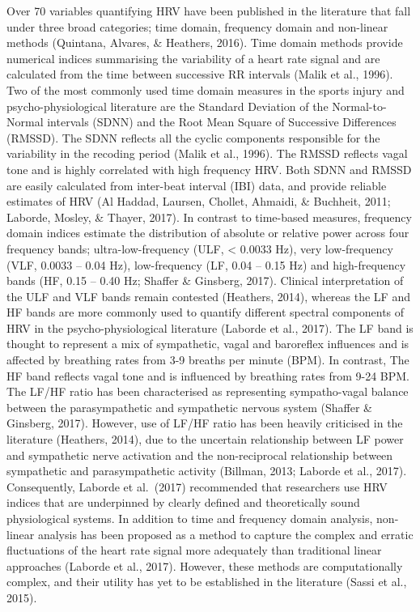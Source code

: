 \documentclass[man,floatsintext]{apa6}
\begin{document}
Over 70 variables quantifying HRV have been published in the literature that fall under three broad categories; time domain, frequency domain and non-linear methods (Quintana, Alvares, \& Heathers, 2016).
Time domain methods provide numerical indices summarising the variability of a heart rate signal and are calculated from the time between successive RR intervals (Malik et al., 1996).
Two of the most commonly used time domain measures in the sports injury and psycho-physiological literature are the Standard Deviation of the Normal-to-Normal intervals (SDNN) and the Root Mean Square of Successive Differences (RMSSD).
The SDNN reflects all the cyclic components responsible for the variability in the recoding period (Malik et al., 1996).
The RMSSD reflects vagal tone and is highly correlated with high frequency HRV.
Both SDNN and RMSSD are easily calculated from inter-beat interval (IBI) data, and provide reliable estimates of HRV (Al Haddad, Laursen, Chollet, Ahmaidi, \& Buchheit, 2011; Laborde, Mosley, \& Thayer, 2017).
In contrast to time-based measures, frequency domain indices estimate the distribution of absolute or relative power across four frequency bands; ultra-low-frequency (ULF, \textless{} 0.0033 Hz), very low-frequency (VLF, 0.0033 -- 0.04 Hz), low-frequency (LF, 0.04 -- 0.15 Hz) and high-frequency bands (HF, 0.15 -- 0.40 Hz; Shaffer \& Ginsberg, 2017).
Clinical interpretation of the ULF and VLF bands remain contested (Heathers, 2014), whereas the LF and HF bands are more commonly used to quantify different spectral components of HRV in the psycho-physiological literature (Laborde et al., 2017).
The LF band is thought to represent a mix of sympathetic, vagal and baroreflex influences and is affected by breathing rates from 3-9 breaths per minute (BPM). In contrast, The HF band reflects vagal tone and is influenced by breathing rates from 9-24 BPM.
The LF/HF ratio has been characterised as representing sympatho-vagal balance between the parasympathetic and sympathetic nervous system (Shaffer \& Ginsberg, 2017).
However, use of LF/HF ratio has been heavily criticised in the literature (Heathers, 2014), due to the uncertain relationship between LF power and sympathetic nerve activation and the non-reciprocal relationship between sympathetic and parasympathetic activity (Billman, 2013; Laborde et al., 2017).
Consequently, Laborde et al.~(2017) recommended that researchers use HRV indices that are underpinned by clearly defined and theoretically sound physiological systems.
In addition to time and frequency domain analysis, non-linear analysis has been proposed as a method to capture the complex and erratic fluctuations of the heart rate signal more adequately than traditional linear approaches (Laborde et al., 2017).
However, these methods are computationally complex, and their utility has yet to be established in the literature (Sassi et al., 2015).
\end{document}
